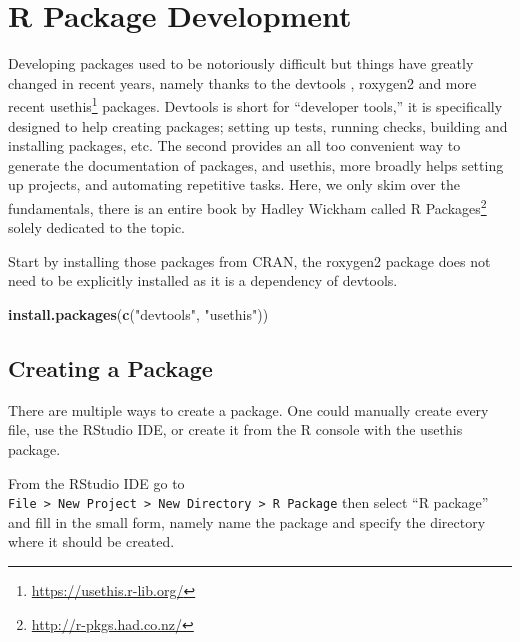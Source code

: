 \documentclass[
]{krantz}
\makeatletter
\newenvironment{Shaded}{\begin{snugshade}}{\end{snugshade}}
\newcommand{\KeywordTok}[1]{\textcolor[rgb]{0.27,0.27,0.27}{\textbf{#1}}}
\newcommand{\NormalTok}[1]{#1}
\newcommand{\StringTok}[1]{\textcolor[rgb]{0.5,0.5,0.5}{#1}}
\renewcommand{\href}[2]{#2\footnote{\url{#1}}}
\newenvironment{kframe}{%
\medskip{}
\setlength{\fboxsep}{.8em}
 \def\at@end@of@kframe{}%
 \ifinner\ifhmode%
  \def\at@end@of@kframe{\end{minipage}}%
  \begin{minipage}{\columnwidth}%
 \fi\fi%
 \def\FrameCommand##1{\hskip\@totalleftmargin \hskip-\fboxsep
 \colorbox{shadecolor}{##1}\hskip-\fboxsep
     \hskip-\linewidth \hskip-\@totalleftmargin \hskip\columnwidth}%
 \MakeFramed {\advance\hsize-\width
   \@totalleftmargin\z@ \linewidth\hsize
   \@setminipage}}%
 {\par\unskip\endMakeFramed%
 \at@end@of@kframe}
\renewenvironment{Shaded}{\begin{kframe}}{\end{kframe}}
\makeatother
\begin{document}
\hypertarget{r-package-development}{%
\section{R Package Development}\label{r-package-development}}

Developing packages used to be notoriously difficult but things have greatly changed in recent years, namely thanks to the devtools \citep{R-devtools}, roxygen2 \citep{R-roxygen2} and more recent \href{https://usethis.r-lib.org/}{usethis} \citep{R-usethis} packages. Devtools is short for ``developer tools,'' it is specifically designed to help creating packages; setting up tests, running checks, building and installing packages, etc. The second provides an all too convenient way to generate the documentation of packages, and usethis, more broadly helps setting up projects, and automating repetitive tasks. Here, we only skim over the fundamentals, there is an entire book by Hadley Wickham called \href{http://r-pkgs.had.co.nz/}{R Packages} solely dedicated to the topic.

Start by installing those packages from CRAN, the roxygen2 package does not need to be explicitly installed as it is a dependency of devtools.

\begin{Shaded}
\begin{Highlighting}[]
\KeywordTok{install.packages}\NormalTok{(}\KeywordTok{c}\NormalTok{(}\StringTok{"devtools"}\NormalTok{, }\StringTok{"usethis"}\NormalTok{))}
\end{Highlighting}
\end{Shaded}

\hypertarget{creating-a-package}{%
\subsection{Creating a Package}\label{creating-a-package}}

There are multiple ways to create a package. One could manually create every file, use the RStudio IDE, or create it from the R console with the usethis \citep{R-usethis} package.

From the RStudio IDE go to \texttt{File\ \textgreater{}\ New\ Project\ \textgreater{}\ New\ Directory\ \textgreater{}\ R\ Package} then select ``R package'' and fill in the small form, namely name the package and specify the directory where it should be created.
\end{document}
